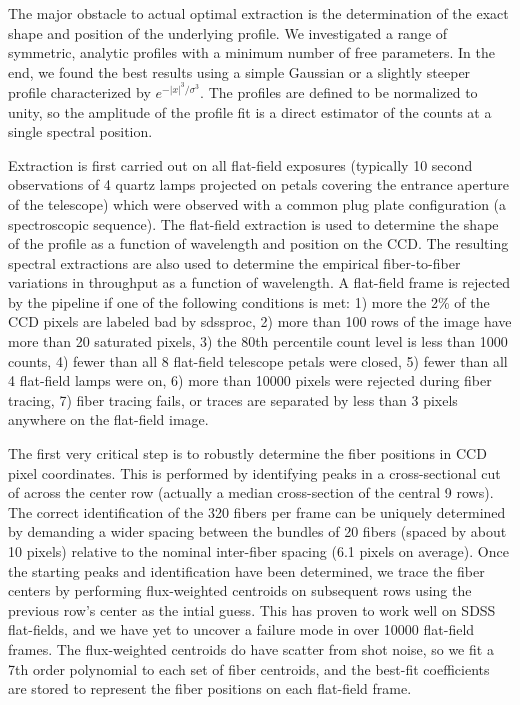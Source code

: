 \documentclass[12pt,preprint]{aastex}
\begin{document}
The major obstacle to actual optimal extraction is the determination of 
the exact shape and position of the underlying profile.  
We investigated a range of symmetric, analytic profiles with a 
minimum number of free parameters.  In the end, we found the best 
results using a simple Gaussian or a slightly steeper profile 
characterized by $e^{-|x|^3/\sigma^3}$.  The profiles are defined to be 
normalized to unity, so the amplitude of the profile fit is a 
direct estimator of the counts at a single spectral position. 

Extraction is first carried out on all flat-field exposures 
(typically 10 second observations of 4 quartz lamps projected on petals covering the entrance aperture of the telescope) which were observed
with a common plug plate configuration (a spectroscopic sequence). 
The flat-field extraction is used to determine the shape of
the profile as a function of wavelength and position on the CCD.  
The resulting spectral extractions are also used to 
determine the empirical fiber-to-fiber variations in throughput 
as a function of wavelength.   
A flat-field frame is rejected by the pipeline if one of the
following conditions is met:  1) more the 2\% of the CCD pixels are labeled
bad by sdssproc, 2) more than 100 rows of the image have more than 20 saturated
pixels, 
3) the 80th percentile count level is less than 1000 counts, 
4) fewer than all 8 flat-field telescope petals were closed, 
5) fewer than all 4 flat-field lamps were on,
6) more than 10000 pixels were rejected during fiber tracing, 
7) fiber tracing fails, or traces are separated by less than 3 pixels anywhere
on the flat-field image.

The first very critical step is to robustly determine the fiber positions 
in CCD pixel coordinates.
This is performed by identifying peaks in a cross-sectional cut of across 
the center row (actually a median cross-section of the central 9 rows).  
The correct identification of the 320 fibers per frame can be 
uniquely determined by demanding a wider spacing between the bundles 
of 20 fibers (spaced by about 10 pixels) relative to the nominal inter-fiber 
spacing (6.1 pixels on average).  Once the starting peaks and 
identification have been determined, we trace the fiber centers 
by performing flux-weighted centroids on subsequent rows
using the previous row's center as the intial guess.  This has proven to 
work well on SDSS flat-fields, and we have yet to uncover a failure 
mode in over 10000 flat-field frames.
The flux-weighted centroids do have scatter from shot noise, 
so we fit a 7th order polynomial to each set of fiber centroids, 
and the best-fit coefficients are stored to represent the fiber positions 
on each flat-field frame.
\end{document}
